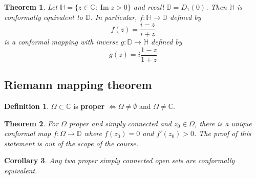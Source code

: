 \documentclass[12pt]{article}
\newtheorem{thm}{Theorem}[section]
\newtheorem{cor}[thm]{Corollary}
\theoremstyle{definition}
\newtheorem{defn}{Definition}[section]
\newcommand{\C}{\mathbb{C}}
\newcommand{\D}{\mathbb{D}}
\DeclareMathOperator{\im}{Im}
\begin{document}
\begin{thm}
  Let $\mathbb{H} = \{z \in \C : \im{z} > 0\}$ and recall $\D = D_1(0)$.
  Then $\mathbb{H}$ is conformally equivalent to $\D$.
  In particular, $f : \mathbb{H} \to \D$ defined by
  $$f(z) = \frac{i - z}{i + z}$$
  is a conformal mapping with inverse $g : \D \to \mathbb{H}$ defined by
  $$g(z) = i\frac{1 - z}{1 + z}$$
\end{thm}

\subsection{Riemann mapping theorem}

\begin{defn}
  $\Omega \subset \C$ is \textbf{proper} $\iff \Omega \neq \emptyset$ and $\Omega \neq \C$.
\end{defn}

\begin{thm}
  For $\Omega$ proper and simply connected and $z_0 \in \Omega$, there is a unique conformal map $f : \Omega \to \D$ where $f(z_0) = 0$ and $f'(z_0) > 0$.
  The proof of this statement is out of the scope of the course.
\end{thm}

\begin{cor}
  Any two proper simply connected open sets are conformally equivalent.
\end{cor}
\end{document}
